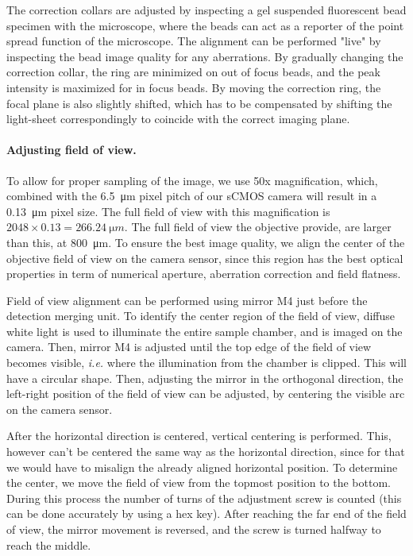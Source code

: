       The correction collars are adjusted by inspecting a gel suspended fluorescent bead specimen with the microscope, where the beads can act as a reporter of the point spread function of the microscope. The alignment can be performed "live" by inspecting the bead image quality for any aberrations. By gradually changing the correction collar, the ring are minimized on out of focus beads, and the peak intensity is maximized for in focus beads. By moving the correction ring, the focal plane is also slightly shifted, which has to be compensated by shifting the light-sheet correspondingly to coincide with the correct imaging plane.

    \paragraph{Adjusting field of view.}
      To allow for proper sampling of the image, we use 50x magnification, which, combined with the \SI{6.5}{\micro m} pixel pitch of our sCMOS camera will result in a \SI{0.13}{\micro m} pixel size. The full field of view with this magnification is $2048 \times 0.13 = \SI{266.24}{\micro m}$. The full field of view the objective provide, are larger than this, at \SI{800}{\micro m}. To ensure the best image quality, we align the center of the objective field of view on the camera sensor, since this region has the best optical properties in term of numerical aperture, aberration correction and field flatness.

      Field of view alignment can be performed using mirror M4 just before the detection merging unit. To identify the center region of the field of view, diffuse white light is used to illuminate the entire sample chamber, and is imaged on the camera. Then, mirror M4 is adjusted until the top edge of the field of view becomes visible, \textit{i.e.} where the illumination from the chamber is clipped. This will have a circular shape. Then, adjusting the mirror in the orthogonal direction, the left-right position of the field of view can be adjusted, by centering the visible arc on the camera sensor.

      After the horizontal direction is centered, vertical centering is performed. This, however can't be centered the same way as the horizontal direction, since for that we would have to misalign the already aligned horizontal position. To determine the center, we move the field of view from the topmost position to the bottom. During this process the number of  turns of the adjustment screw is counted (this can be done accurately by using a hex key). After reaching the far end of the field of view, the mirror movement is reversed, and the screw is turned halfway to reach the middle.

